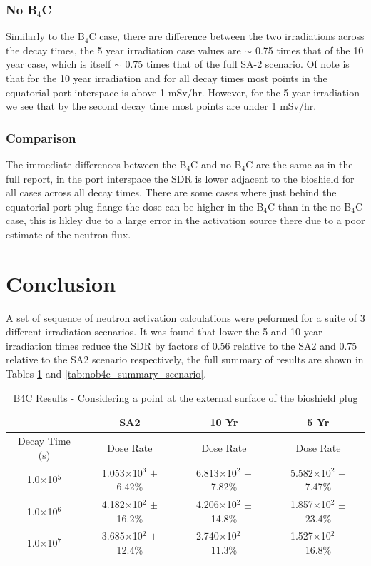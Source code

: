 \documentclass[12pt]{article}
\begin{document}
\subsubsection*{No B$_4$C}
Similarly to the B$_4$C case, there are difference between the two irradiations
across the decay times, the 5 year irradiation case values are $\sim$ 0.75 times
 that of the 10 year case, which is itself $\sim$ 0.75 times that of the full 
SA-2 scenario. Of note is that for the 10 year irradiation and for all decay 
times most points in the equatorial port interspace is above 1 mSv/hr. However,
for the 5 year irradiation we see that by the second decay time most points 
are under 1 mSv/hr. 
\subsubsection*{Comparison}
The immediate differences between the B$_4$C and no B$_4$C are the same as in 
the full report, in the port interspace the SDR is lower adjacent to the 
bioshield for all cases across all decay times. There are some cases where
just behind the equatorial port plug flange the dose can be higher in the 
B$_4$C than in the no B$_4$C case, this is likley due to a large error in the 
activation source there due to a poor estimate of the neutron flux. 
\clearpage
\newpage
\section{Conclusion}
A set of sequence of neutron activation calculations were peformed for a suite 
of 3 different irradiation scenarios. It was found that lower the 5 and 10 year
irradiation times reduce the SDR by factors of 0.56 relative to the SA2 and
0.75 relative to the SA2 scenario respectively, the full summary of results
are shown in Tables \ref{tab:b4c_summary_scenario} and 
\ref{tab:nob4c_summary_scenario}.

\begin{table}[ht!]
   \centering      
   \begin{tabular}{| c | c | c | c |}
      \hline
      & SA2 & 10 Yr & 5 Yr \\
      \hline
      Decay Time (s) & Dose Rate & Dose Rate & Dose Rate \\
      \hline
      1.0$\times$10$^{5}$ & 1.053$\times$10$^{3}$ $\pm$ 6.42\% & 6.813$\times$10$^{2}$ $\pm$ 7.82\% & 5.582$\times$10$^{2}$ $\pm$ 7.47\%\\
      1.0$\times$10$^{6}$ & 4.182$\times$10$^{2}$ $\pm$ 16.2\% & 4.206$\times$10$^{2}$ $\pm$ 14.8\% & 1.857$\times$10$^{2}$ $\pm$ 23.4\%\\
      1.0$\times$10$^{7}$ & 3.685$\times$10$^{2}$ $\pm$ 12.4\% & 2.740$\times$10$^{2}$ $\pm$ 11.3\% & 1.527$\times$10$^{2}$ $\pm$ 16.8\%\\
      \hline
\end{tabular}
\caption{B4C Results - Considering a point at the external surface of the bioshield plug}
\label{tab:b4c_summary_scenario}
\end{table}
\end{document}
